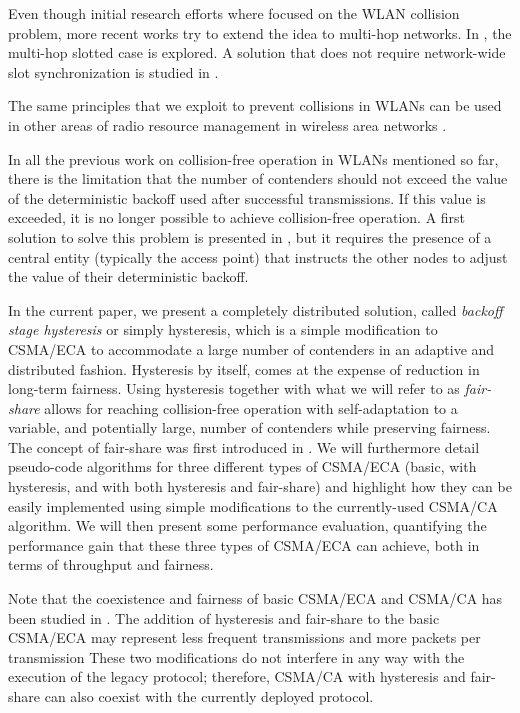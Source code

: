 \documentclass[conference]{IEEEtran}
\newcommand{\AzCom}[1]{}
\begin{document}
Even though initial research efforts where focused on the WLAN collision problem, more recent works try to extend the idea to multi-hop networks.
In \cite{hui2011epp}, the multi-hop slotted case is explored.
A solution that does not require network-wide slot synchronization is studied in  \cite{barcelo2013dcc}.

\AzCom{Greenfield paragraph moved to the Results section} The same principles that we exploit to prevent collisions in WLANs can be used in other areas of radio resource management in wireless area networks \cite{duffy2011dcs,checco2012scs,checco2012lbc,khan2013aso}.

In all the previous work on collision-free operation in WLANs mentioned so far, there is the limitation that the number of contenders should not exceed the value of the deterministic backoff used after successful transmissions.
If this value is exceeded, it is no longer possible to achieve collision-free operation.
A first solution to solve this problem is presented in \cite{barcelo2011tcf}, but it requires the presence of a central entity (typically the access point) that instructs the other nodes to adjust the value of their deterministic backoff.

In the current paper, we present a completely distributed solution, called {\it backoff stage hysteresis} or simply hysteresis, which is a simple modification to CSMA/ECA to accommodate a large number of contenders in an adaptive and distributed fashion. Hysteresis by itself, comes at the expense of reduction in long-term fairness. Using hysteresis together with what we will refer to as {\it fair-share} allows for reaching collision-free operation with self-adaptation to a variable, and potentially large, number of contenders while preserving fairness. The concept of fair-share was first introduced in \cite{fang2011dlm}. We will furthermore detail pseudo-code algorithms for three different types of CSMA/ECA (basic, with hysteresis, and with both hysteresis and fair-share) and highlight how they can be easily implemented using simple modifications to the currently-used CSMA/CA algorithm. We will then present some performance evaluation, quantifying the performance gain that these three types of CSMA/ECA can achieve, both in terms of throughput and fairness.

Note that the coexistence and fairness of basic CSMA/ECA and CSMA/CA has been studied in \cite{barcelo2010fcc}.
The addition of hysteresis and fair-share to the basic CSMA/ECA may represent less frequent transmissions and more packets per transmission
These two modifications do not interfere in any way with the execution of the legacy protocol; therefore, CSMA/CA with hysteresis and fair-share can also coexist with the currently deployed protocol.
\end{document}

